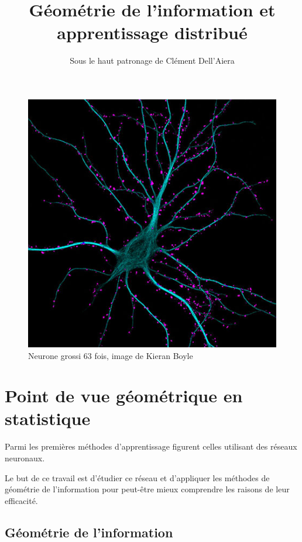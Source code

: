 \documentclass{article}
\title{Géométrie de l'information et apprentissage distribué}
\author{Sous le haut patronage de Clément Dell'Aiera}
\date{}
\begin{document}
\maketitle

\begin{figure}[h]\centering
\includegraphics[scale=0.6]{Neurone.jpg}
\caption{Neurone grossi 63 fois, image de Kieran Boyle}
\label{fig:Neurone}
\end{figure}

\newpage
\tableofcontents

\newpage
\section{Point de vue géométrique en statistique}

Parmi les premières méthodes d'apprentissage figurent celles utilisant des réseaux neuronaux. %

Le but de ce travail est d'étudier ce réseau et d'appliquer les méthodes de géométrie de l'information pour peut-être mieux comprendre les raisons de leur efficacité.%

\subsection{Géométrie de l'information}
\end{document}
